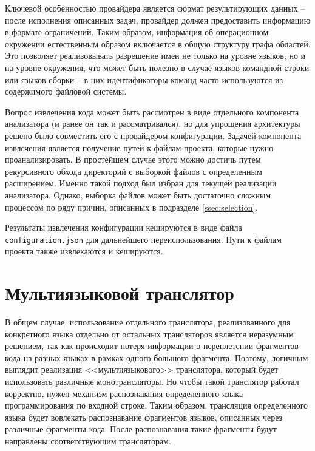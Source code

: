 Ключевой особенностью провайдера является формат результирующих данных -- после исполнения описанных задач, провайдер
должен предоставить информацию в формате ограничений. Таким образом, информация об операционном окружении
естественным образом включается в общую структуру графа областей. Это позволяет реализовывать разрешение имен
не только на уровне языков, но и на уровне окружения, что может быть полезно в случае языков командной строки
или языков сборки -- в них идентификаторы команд часто используются из содержимого файловой системы.

Вопрос извлечения кода может быть рассмотрен в виде отдельного компонента анализатора (и ранее он так и
рассматривался), но для упрощения архитектуры решено было совместить его с провайдером конфигурации.
Задачей компонента извлечения является получение путей к файлам проекта, которые нужно проанализировать.
В простейшем случае этого можно достичь путем рекурсивного обхода директорий с выборкой файлов с определенным
расширением. Именно такой подход был избран для текущей реализации анализатора. Однако, выборка
файлов может быть достаточно сложным процессом по ряду причин, описанных в подразделе \ref{ssec:selection}.

Результаты извлечения конфигурации кешируются в виде файла \texttt{configuration.json} для дальнейшего переиспользования.
Пути к файлам проекта также извлекаются и кешируются.

\section{Мультиязыковой транслятор}

В общем случае, использование отдельного транслятора, реализованного для конкретного языка отдельно
от остальных трансляторов является неразумным решением, так как происходит потеря информации о переплетении
фрагментов кода на разных языках в рамках одного большого фрагмента. Поэтому, логичным выглядит реализация
<<мультиязыкового>> транслятора, который будет использовать различные монотрансляторы. Но чтобы такой
транслятор работал корректно, нужен механизм 
распознавания определенного языка программирования по входной строке. Таким образом,
трансляция определенного языка будет вовлекать распознавание фрагментов языков, описанных через различные фрагменты кода.
После распознавания такие фрагменты будут направлены соответствующим трансляторам.

